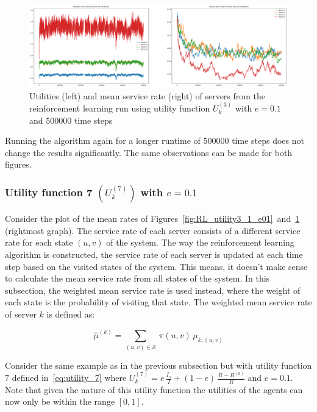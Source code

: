 \begin{figure}[H]
    \includegraphics[width=\textwidth]{chapters/06_agent_based_extension/Bin/reinforcement_learning_results/utility_3/u3_2_e01.pdf}
    \caption{Utilities (left) and mean service rate (right) of servers from the
    reinforcement learning run using utility function \(U_k^{(3)}\) with
    \(e = 0.1\) and \(500000\) time steps}
    \label{fig:RL_utility3_2_e01}
\end{figure}

Running the algorithm again for a longer runtime of \(500000\) time steps
does not change the results significantly.
The same observations can be made for both figures.



\subsubsection{Utility function 7 \((U_k^{(7)})\) with \(e = 0.1\)}
\label{sec:utility_7_01_results}

Consider the plot of the mean rates of
Figures~\ref{fig:RL_utility3_1_e01}~and~\ref{fig:RL_utility3_2_e01}
(rightmost graph).
The service rate of each server consists of a different service rate for each
state \((u, v)\) of the system.
The way the reinforcement learning algorithm is constructed, the service rate
of each server is updated at each time step based on the visited states of the
system.
This means, it doesn't make sense to calculate the mean service rate from all
states of the system.
In this subsection, the weighted mean service rate is used instead, where
the weight of each state is the probability of visiting that state.
The weighted mean service rate of server \(k\) is defined as:

\begin{equation}
    \hat{\mu}^{(k)} = \sum_{(u, v) \in \mathcal{S}} \,
    \pi(u, v) \, \mu_{k, (u, v)}
\end{equation}

Consider the same example as in the previous subsection but with utility
function 7 defined in~\eqref{eq:utility_7} where
\(U_k^{(7)} = e \, \frac{I_s}{I} + (1 - e) \, \frac{R - B^{(k)}}{R}\) and
\(e = 0.1\).
Note that given the nature of this utility function the utilities of the agents
can now only be within the range \([0, 1]\).

